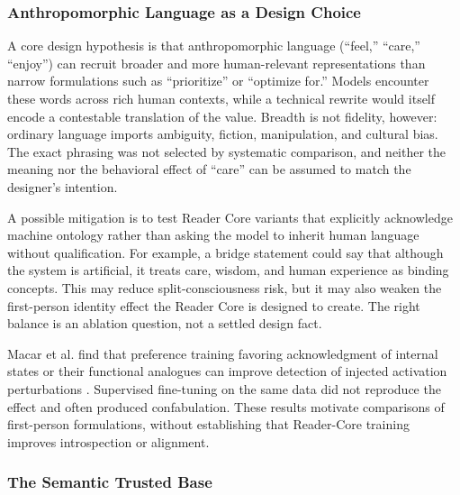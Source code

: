 \documentclass[11pt]{article}
\begin{document}
\subsubsection{Anthropomorphic Language as a Design Choice}\label{sec:human-words}

A core design hypothesis is that anthropomorphic language (``feel,'' ``care,''
``enjoy'') can recruit broader and more human-relevant representations than
narrow formulations such as ``prioritize'' or ``optimize for.'' Models encounter
these words across rich human contexts, while a technical rewrite would itself
encode a contestable translation of the value. Breadth is not fidelity,
however: ordinary language imports ambiguity, fiction, manipulation, and
cultural bias. The exact phrasing was not selected by systematic comparison,
and neither the meaning nor the behavioral effect of
``care'' can be assumed to match the designer's intention.

A possible mitigation is to test Reader Core variants that explicitly acknowledge machine ontology rather than asking the model to inherit human language without qualification. For example, a bridge statement could say that although the system is artificial, it treats care, wisdom, and human experience as binding concepts. This may reduce split-consciousness risk, but it may also weaken the first-person identity effect the Reader Core is designed to create. The right balance is an ablation question, not a settled design fact.

Macar et al. find that preference training favoring acknowledgment of internal
states or their functional analogues can improve detection of injected
activation perturbations \cite{macar2026introspective}. Supervised fine-tuning
on the same data did not reproduce the effect and often produced confabulation.
These results motivate comparisons of first-person formulations, without
establishing that Reader-Core training improves introspection or alignment.

\subsubsection{The Semantic Trusted Base}\label{sec:semantic-tcb}
\end{document}
